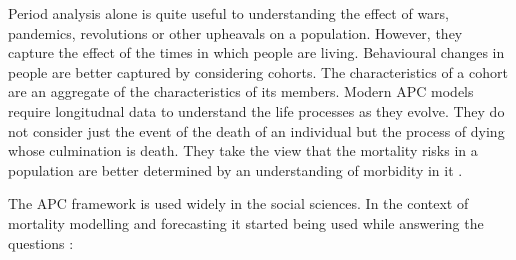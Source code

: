 \documentclass{article}
\numberwithin{equation}{section}
\begin{document}
Period analysis alone is quite useful to understanding the effect of wars,
pandemics, revolutions or other upheavals on a population. However, they
capture the effect of the times in which people are living. Behavioural
changes in people are better captured by considering cohorts. The 
characteristics of a cohort are an aggregate of the characteristics of its 
members\cite{willekens1991age}. Modern APC models require longitudnal data
to understand the life processes as they evolve. They do not consider just
the event of the death of an individual but the process of dying whose 
culmination is death. They take the view that the mortality risks in a 
population are better determined by an understanding of morbidity in it
\cite{van1990determinants}.

The APC framework is used widely in the social sciences. In the context of
mortality modelling and forecasting it started being used while answering the
questions \cite{willekens1991age}:
\end{document}
